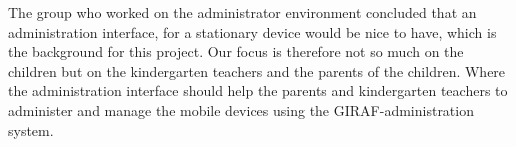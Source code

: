 The group who worked on the administrator environment concluded that an administration interface, for a stationary device would be nice to have, which is the background for this project.
Our focus is therefore not so much on the children but on the kindergarten teachers and the parents of the children. Where the administration interface should help the parents and kindergarten teachers to administer and manage the mobile devices using the GIRAF-administration system.\cite{giraffactors}
